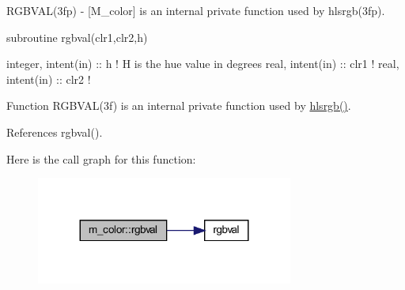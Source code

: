 \begin{DoxyDescription}
\item[\label{_RGBVAL}%
N\+A\+ME ]R\+G\+B\+V\+A\+L(3fp) -\/ \mbox{[}M\+\_\+color\mbox{]} is an internal private function used by hlsrgb(3fp). 


\item[S\+Y\+N\+O\+P\+S\+IS]
\begin{DoxyPre}
    subroutine rgbval(clr1,clr2,h)\end{DoxyPre}



\begin{DoxyPre}     integer, intent(in) :: h ! H is the hue value in degrees
     real, intent(in) :: clr1 !
     real, intent(in) :: clr2 !
    \end{DoxyPre}
 


\item[D\+E\+S\+C\+R\+I\+P\+T\+I\+ON ]Function R\+G\+B\+V\+A\+L(3f) is an internal private function used by \hyperlink{namespacem__color_a40e6c91da216384eded2157cdaf86eba}{hlsrgb()}.




\end{DoxyDescription}

References rgbval().

Here is the call graph for this function\+:
\nopagebreak
\begin{figure}[H]
\begin{center}
\leavevmode
\includegraphics[width=239pt]{namespacem__color_a3e97e24dba7b820f685f13eaa64a6caa_cgraph}
\end{center}
\end{figure}
\mbox{\label{namespacem__color_a386d004a1392b7e01ff66f1676d43def}} 
